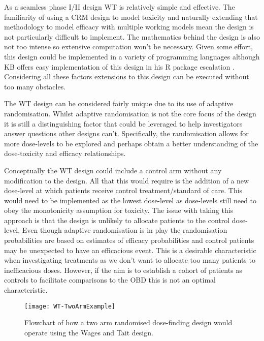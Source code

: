 As a seamless phase \RN{1}/\RN{2} design WT is relatively simple and effective. The familiarity of using a CRM design to model toxicity and naturally extending that methodology to model efficacy with multiple working models mean the design is not particularly difficult to implement. The mathematics behind the design is also not too intense so extensive computation won't be necessary. Given some effort, this design could be implemented in a variety of programming languages although KB offers easy implementation of this design in his R package escalation \cite{brockModularApproachDose2020}. Considering all these factors extensions to this design can be executed without too many obstacles.

The WT design can be considered fairly unique due to its use of adaptive randomisation. Whilst adaptive randomisation is not the core focus of the design it is still a distinguishing factor that could be leveraged to help investigators answer questions other designs can't. Specifically, the randomisation allows for more dose-levels to be explored and perhaps obtain a better understanding of the dose-toxicity and efficacy relationships. 

Conceptually the WT design could include a control arm without any modification to the design. All that this would require is the addition of a new dose-level at which patients receive control treatment/standard of care. This would need to be implemented as the lowest dose-level as dose-levels still need to obey the monotonicity assumption for toxicity. The issue with taking this approach is that the design is unlikely to allocate patients to the control dose-level. Even though adaptive randomisation is in play the randomisation probabilities are based on estimates of efficacy probabilities and control patients may be unexpected to have an efficacious event. This is a desirable characteristic when investigating treatments as we don't want to allocate too many patients to inefficacious doses. However, if the aim is to establish a cohort of patients as controls to facilitate comparisons to the OBD this is not an optimal characteristic. 

\begin{figure}[!h]
	\centering
	\caption[Flowchart of a two arm randomised dose-finding trial.]{Flowchart of how a two arm randomised dose-finding design would operate using the Wages and Tait design.}
	\label{fig_wt:TwoArmExample}
	\texttt{[image: WT-TwoArmExample]}
\end{figure}

